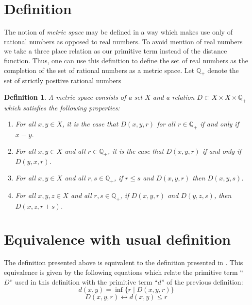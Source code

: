 \documentclass[12pt]{article}
\newtheorem{definition}{Definition}
\begin{document}
\section{Definition}

The notion of \emph{metric space} may be defined in a way which makes use only of rational numbers as opposed to real numbers.  To avoid mention of real numbers we take a three place relation as our primitive term instead of the distance function.  Thus, one can use this definition to define the set of real numbers as the completion of the set of rational numbers as a metric space.  Let $\mathbb{Q}_+$ denote the set of strictly positive rational numbers

\begin{definition}
A \emph{metric space} consists of a set $X$ and a relation $D \subset X \times X \times \mathbb{Q}_+$ which satisfies 
the following properties:
\begin{enumerate}
\item  For all $x,y \in X$, it is the case that $D(x,y,r)$ for all $r \in \mathbb{Q}_+$ if and only if $x = y$.
\item  For all $x,y \in X$ and all $r \in \mathbb{Q}_+$, it is the case that $D(x,y,r)$ if and only if $D(y,x,r)$.
\item For all $x,y \in X$ and all $r,s \in \mathbb{Q}_+$, if $r \le s$ and $D(x,y,r)$ then $D(x,y,s)$.
\item For all $x,y,z \in X$ and all $r,s \in \mathbb{Q}_+$, if $D(x,y,r)$ and $D(y,z,s)$, then $D(x,z,r+s)$.
\end{enumerate}
\end{definition}

\section{Equivalence with usual definition}

The definition presented above is equivalent to the definition presented in 
.
This equivalence is 
given by the following equations which relate the primitive term ``$D$'' used in this definition with the primitive 
term ``$d$'' of the previous definition:
 \[ d(x,y) = \inf \{r \mid D(x,y,r) \} \]
 \[ D(x,y,r) \leftrightarrow d(x,y) \le r \]
\end{document}
